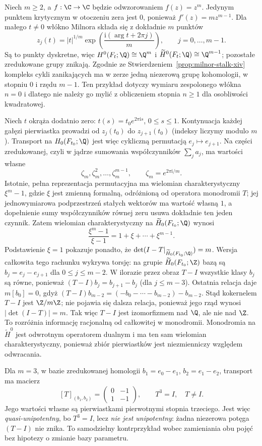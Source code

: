\begin{przyklad}[Cykle zanikające i monodromia dla $f(z)=z^m$]
\label{prz:monodromy-zm-v14}
Niech $m\ge2$, a $f:\C\to\C$ będzie odwzorowaniem
$f(z)=z^m$. Jedynym punktem krytycznym w otoczeniu
zera jest $0$, ponieważ $f'(z)=mz^{m-1}$.
Dla małego $t\ne0$ włókno Milnora składa się
z dokładnie $m$ punktów
\[
 z_j(t)=|t|^{1/m}
   \exp\!\left(\frac{\mathrm i(\arg t+2\pi j)}m\right),
 \qquad j=0,\dots,m-1.
\]
Są to punkty dyskretne, więc
$H^0(F_t;\Q)\cong\Q^m$ i
$\widetilde H^0(F_t;\Q)\cong\Q^{m-1}$;
pozostałe zredukowane grupy znikają.
Zgodnie ze Stwierdzeniem~\ref{prop:milnor-stalk-xiv}
kompleks cykli zanikających ma w zerze
jedną niezerową grupę kohomologii,
w stopniu $0$ i rzędu $m-1$.
Ten przykład dotyczy wymiaru zespolonego
włókna $n=0$ i dlatego nie należy go mylić
z obliczeniem stopnia $n\ge1$ dla
osobliwości kwadratowej.

Niech $t$ okrąża dodatnio zero:
$t(s)=t_0e^{2\pi\mathrm i s}$, $0\le s\le1$.
Kontynuacja każdej gałęzi pierwiastka
prowadzi od $z_j(t_0)$ do $z_{j+1}(t_0)$
(indeksy liczymy modulo $m$).
Transport na $H_0(F_{t_0};\Q)$
jest więc cykliczną permutacją
$e_j\mapsto e_{j+1}$. Na części zredukowanej,
czyli w jądrze sumowania współczynników
$\sum_j a_j$, ma wartości własne
\[
 \zeta_m,\zeta_m^2,\dots,\zeta_m^{m-1},
 \qquad \zeta_m=e^{2\pi\mathrm i/m}.
\]
Istotnie, pełna reprezentacja permutacyjna
ma wielomian charakterystyczny $\xi^m-1$,
gdzie $\xi$ jest zmienną formalną, odróżnioną
od operatora monodromii $T$;
jej jednowymiarowa podprzestrzeń
stałych wektorów ma wartość własną $1$,
a dopełnienie sumy współczynników równej
zeru usuwa dokładnie ten jeden czynnik.
Zatem wielomian charakterystyczny na
$\widetilde H_0(F_{t_0};\Q)$ wynosi
\[
 \frac{\xi^m-1}{\xi-1}
=1+\xi+\cdots+\xi^{m-1}.
\]
Podstawienie $\xi=1$ pokazuje ponadto, że
$\det(I-T|_{\widetilde H_0(F_{t_0};\Q)})=m$.
Wersja całkowita tego rachunku wykrywa torsję:
na grupie $\widetilde H_0(F_{t_0};\Z)$ bazą są
$b_j=e_j-e_{j+1}$ dla $0\le j\le m-2$.
W ilorazie przez obraz $T-I$ wszystkie klasy $b_j$
są równe, ponieważ $(T-I)b_j=b_{j+1}-b_j$
(dla $j\le m-3$). Ostatnia relacja daje
$m[b_0]=0$, gdyż
$(T-I)b_{m-2}=(-b_0-\cdots-b_{m-2})-b_{m-2}$.
Stąd kokernelem $T-I$ jest $\Z/m\Z$;
nie pojawia się dalsza relacja, ponieważ jego rząd
wynosi $|\det(I-T)|=m$.
Tak więc $T-I$ jest izomorfizmem nad $\Q$, ale nie
nad $\Z$. To rozróżnia informację racjonalną
od całkowitej w monodromii.
Monodromia na $\widetilde H^0$ jest
odwrotnym operatorem dualnym i ma ten sam
wielomian charakterystyczny, ponieważ
zbiór pierwiastków jest niezmienniczy
względem odwracania.

Dla $m=3$, w bazie zredukowanej homologii
$b_1=e_0-e_1$, $b_2=e_1-e_2$, transport ma macierz
\[
 [T]_{(b_1,b_2)}
 =\begin{pmatrix}0&-1\\1&-1\end{pmatrix},
 \qquad T^3=I,\quad T\ne I.
\]
Jego wartości własne są pierwiastkami
pierwotnymi stopnia trzeciego.
Jest więc \emph{quasi-unipotentny},
bo $T^3=I$, lecz \emph{nie jest unipotentny}:
żadna niezerowa potęga $(T-I)$ nie znika.
To samodzielny kontrprzykład wobec
zamieniania obu pojęć bez hipotezy
o zmianie bazy parametru.
\end{przyklad}

